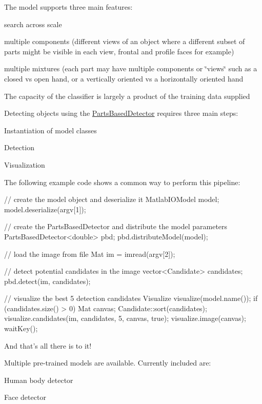 \-The model supports three main features\-:
\begin{DoxyItemize}
\item search across scale
\item multiple components (different views of an object where a different subset of parts might be visible in each view, frontal and profile faces for example)
\item multiple mixtures (each part may have multiple components or \char`\"{}views\char`\"{} such as a closed vs open hand, or a vertically oriented vs a horizontally oriented hand
\end{DoxyItemize}

\-The capacity of the classifier is largely a product of the training data supplied

\-Detecting objects using the \hyperlink{classPartsBasedDetector}{\-Parts\-Based\-Detector} requires three main steps\-:
\begin{DoxyItemize}
\item \-Instantiation of model classes
\item \-Detection
\item \-Visualization
\end{DoxyItemize}

\-The following example code shows a common way to perform this pipeline\-: 
\begin{DoxyCode}
 // create the model object and deserialize it
 MatlabIOModel model;
 model.deserialize(argv[1]);

 // create the PartsBasedDetector and distribute the model parameters
 PartsBasedDetector<double> pbd;
 pbd.distributeModel(model);

 // load the image from file
 Mat im = imread(argv[2]);

 // detect potential candidates in the image
 vector<Candidate> candidates;
 pbd.detect(im, candidates);

 // visualize the best 5 detection candidates
 Visualize visualize(model.name());
 if (candidates.size() > 0) {
  Mat canvas;
        Candidate::sort(candidates);
        visualize.candidates(im, candidates, 5, canvas, true);
        visualize.image(canvas);
        waitKey();
 }
\end{DoxyCode}


\-And that's all there is to it!

\-Multiple pre-\/trained models are available. \-Currently included are\-:
\begin{DoxyItemize}
\item \-Human body detector
\item \-Face detector
\end{DoxyItemize}

